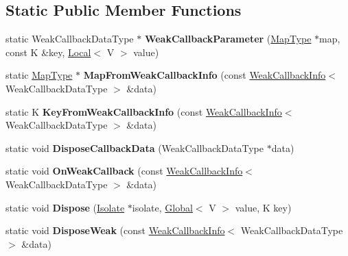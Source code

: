 \subsection*{Static Public Member Functions}
\begin{DoxyCompactItemize}
\item 
static Weak\+Callback\+Data\+Type $\ast$ {\bfseries Weak\+Callback\+Parameter} (\hyperlink{classv8_1_1_global_value_map}{Map\+Type} $\ast$map, const K \&key, \hyperlink{classv8_1_1_local}{Local}$<$ V $>$ value)\hypertarget{classv8_1_1_default_global_map_traits_a3d4b483a077d6e5665cc62a23c719ee8}{}\label{classv8_1_1_default_global_map_traits_a3d4b483a077d6e5665cc62a23c719ee8}

\item 
static \hyperlink{classv8_1_1_global_value_map}{Map\+Type} $\ast$ {\bfseries Map\+From\+Weak\+Callback\+Info} (const \hyperlink{classv8_1_1_weak_callback_info}{Weak\+Callback\+Info}$<$ Weak\+Callback\+Data\+Type $>$ \&data)\hypertarget{classv8_1_1_default_global_map_traits_ae65c4d78f93d033712aa328654c00250}{}\label{classv8_1_1_default_global_map_traits_ae65c4d78f93d033712aa328654c00250}

\item 
static K {\bfseries Key\+From\+Weak\+Callback\+Info} (const \hyperlink{classv8_1_1_weak_callback_info}{Weak\+Callback\+Info}$<$ Weak\+Callback\+Data\+Type $>$ \&data)\hypertarget{classv8_1_1_default_global_map_traits_a2ebc8d3bbfbe32598863ab44caa36207}{}\label{classv8_1_1_default_global_map_traits_a2ebc8d3bbfbe32598863ab44caa36207}

\item 
static void {\bfseries Dispose\+Callback\+Data} (Weak\+Callback\+Data\+Type $\ast$data)\hypertarget{classv8_1_1_default_global_map_traits_a106883e8168f48826fcfb71aa88e7994}{}\label{classv8_1_1_default_global_map_traits_a106883e8168f48826fcfb71aa88e7994}

\item 
static void {\bfseries On\+Weak\+Callback} (const \hyperlink{classv8_1_1_weak_callback_info}{Weak\+Callback\+Info}$<$ Weak\+Callback\+Data\+Type $>$ \&data)\hypertarget{classv8_1_1_default_global_map_traits_a2e50fabc65cf498e981015c1e92ece3e}{}\label{classv8_1_1_default_global_map_traits_a2e50fabc65cf498e981015c1e92ece3e}

\item 
static void {\bfseries Dispose} (\hyperlink{classv8_1_1_isolate}{Isolate} $\ast$isolate, \hyperlink{classv8_1_1_global}{Global}$<$ V $>$ value, K key)\hypertarget{classv8_1_1_default_global_map_traits_af2a539ddbe5db2b6e1e944590e1dd7e6}{}\label{classv8_1_1_default_global_map_traits_af2a539ddbe5db2b6e1e944590e1dd7e6}

\item 
static void {\bfseries Dispose\+Weak} (const \hyperlink{classv8_1_1_weak_callback_info}{Weak\+Callback\+Info}$<$ Weak\+Callback\+Data\+Type $>$ \&data)\hypertarget{classv8_1_1_default_global_map_traits_ad3478535925c0f42664c97c4d35d1c91}{}\label{classv8_1_1_default_global_map_traits_ad3478535925c0f42664c97c4d35d1c91}

\end{DoxyCompactItemize}
